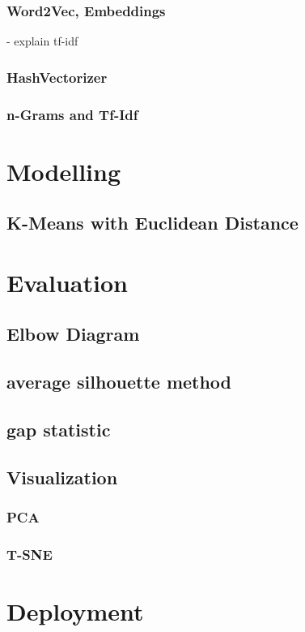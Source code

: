 		\subsubsection{Word2Vec, Embeddings}
		- explain tf-idf
		\subsubsection{HashVectorizer}
		\subsubsection{n-Grams and Tf-Idf}

\section{Modelling}
	\subsection{K-Means with Euclidean Distance}
\section{Evaluation}
	\subsection{Elbow Diagram}
	\subsection{average silhouette method}
	\subsection{gap statistic}
	\subsection{Visualization}
		\subsubsection{PCA}
		\subsubsection{T-SNE}
\section{Deployment}
